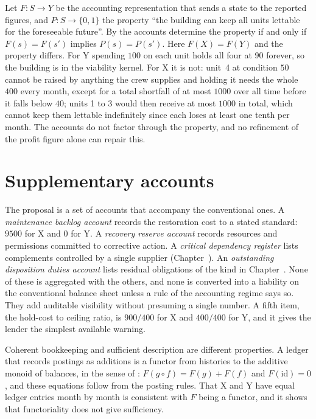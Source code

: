 Let $F:S\to Y$ be the accounting representation that sends a state to the reported figures, and $P:S\to\{0,1\}$ the property ``the building can keep all units lettable for the foreseeable future''. By  the accounts determine the property if and only if $F(s)=F(s')$ implies $P(s)=P(s')$. Here $F(X)=F(Y)$ and the property differs. For Y spending $100$ on each unit holds all four at $90$ forever, so the building is in the viability kernel. For X it is not: unit~4 at condition $50$ cannot be raised by anything the crew supplies and holding it needs the whole $400$ every month, except for a total shortfall of at most $1000$ over all time before it falls below $40$; units 1 to 3 would then receive at most $1000$ in total, which cannot keep them lettable indefinitely since each loses at least one tenth per month. The accounts do not factor through the property, and no refinement of the profit figure alone can repair this.

\section{Supplementary accounts}

The proposal is a set of accounts that accompany the conventional ones. A \emph{maintenance backlog account} records the restoration cost to a stated standard: $9500$ for X and $0$ for Y. A \emph{recovery reserve account} records resources and permissions committed to corrective action. A \emph{critical dependency register} lists complements controlled by a single supplier (Chapter~). An \emph{outstanding disposition duties account} lists residual obligations of the kind in Chapter~. None of these is aggregated with the others, and none is converted into a liability on the conventional balance sheet unless a rule of the accounting regime says so. They add auditable visibility without presuming a single number. A fifth item, the hold-cost to ceiling ratio, is $900/400$ for X and $400/400$ for Y, and it gives the lender the simplest available warning.

Coherent bookkeeping and sufficient description are different properties. A ledger that records postings as additions is a functor from histories to the additive monoid of balances, in the sense of : $F(g\circ f)=F(g)+F(f)$ and $F(\mathrm{id})=0$, and these equations follow from the posting rules. That X and Y have equal ledger entries month by month is consistent with $F$ being a functor, and it shows that functoriality does not give sufficiency.


